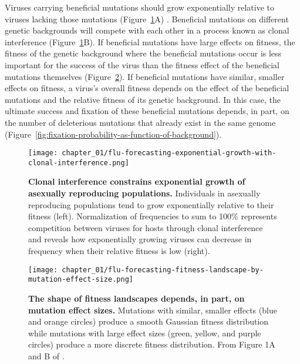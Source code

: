 Viruses carrying beneficial mutations should grow exponentially relative to viruses lacking those mutations (Figure~\ref{fig:exponential-growth-with-clonal-interference}A) \citep{Neher2013}.
Beneficial mutations on different genetic backgrounds will compete with each other in a process known as clonal interference (Figure~\ref{fig:exponential-growth-with-clonal-interference}B).
If beneficial mutations have large effects on fitness, the fitness of the genetic background where the beneficial mutations occur is less important for the success of the virus than the fitness effect of the beneficial mutations themselves (Figure~\ref{fig:fitness-landscape-by-mutation-effect-size}).
If beneficial mutations have similar, smaller effects on fitness, a virus's overall fitness depends on the effect of the beneficial mutations and the relative fitness of its genetic background.
In this case, the ultimate success and fixation of these beneficial mutations depends, in part, on the number of deleterious mutations that already exist in the same genome (Figure~\ref{fig:fixation-probability-as-function-of-background}).

\begin{figure}
  \centering
  \texttt{[image: chapter\_01/flu-forecasting-exponential-growth-with-clonal-interference.png]}
  \caption[{Clonal interference constrains exponential growth of asexually reproducing populations.}]{{\bf Clonal interference constrains exponential growth of asexually reproducing populations.}
    Individuals in asexually reproducing populations tend to grow exponentially relative to their fitness (left).
    Normalization of frequencies to sum to 100\% represents competition between viruses for hosts through clonal interference and reveals how exponentially growing viruses can decrease in frequency when their relative fitness is low (right).\label{fig:exponential-growth-with-clonal-interference} }
\end{figure}

\begin{figure}
  \centering
  \texttt{[image: chapter\_01/flu-forecasting-fitness-landscape-by-mutation-effect-size.png]}
  \caption[{The shape of fitness landscapes depends, in part, on mutation effect sizes.}]{{\bf The shape of fitness landscapes depends, in part, on mutation effect sizes.}
    Mutations with similar, smaller effects (blue and orange circles) produce a smooth Gaussian fitness distribution while mutations with large effect sizes (green, yellow, and purple circles) produce a more discrete fitness distribution.
    From Figure 1A and B of \citet{Neher2013}.\label{fig:fitness-landscape-by-mutation-effect-size} }
\end{figure}

